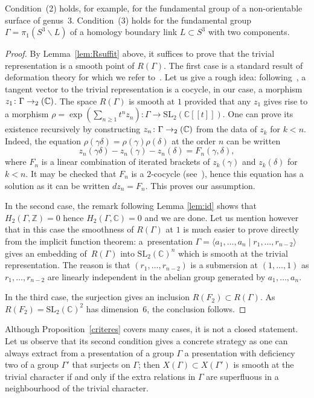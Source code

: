 \documentclass[JEP,XML,SOM,Unicode,NoEqCountersInSection]{cedram}
\newcommand{\lbr}{[\![}
\newcommand{\rbr}{]\!]}
\newcommand{\NoChangel}[1]{%
\expandafter\let\csname old\string#1\endcsname=#1
\let#1=\relax
\newcommand{#1}{\mathcode`l="716C\csname old\string#1\endcsname\mathcode`l="7160 }%
}
\theoremstyle{definition}
\newcommand{\ZZ}{\mathbb{Z}}
\newcommand{\CC}{\mathbb{C}}
\newcommand{\SL}{\mathrm{SL}}
\newcommand{\petitsl}{\mathrm{sl}}\NoChangel{\petitsl}
\begin{document}
Condition~(2) holds, for example, for the fundamental group of a
non-orientable surface of genus~3.
Condition~(3) holds for the fundamental group
$\Gamma=\pi_1(S^3\smallsetminus L)$ of a homology boundary link
$L\subset S^3$ with two components.

\begin{proof}
By Lemma~\ref{lem:Rsuffit} above, it suffices to prove that the trivial
representation is a smooth point of $R(\Gamma)$. The first case is a
standard result of deformation theory for which we refer
to~\cite{NijenhuisRichardson}. Let us give a rough idea:
following~\cite{Weil}, a tangent vector to the trivial representation is
a cocycle, in our case, a morphism $z_1\colon\Gamma\to \petitsl_2(\CC)$.
The space $R(\Gamma)$ is smooth at $1$ provided that any $z_1$ gives rise
to a morphism
$\rho=\exp(\sum_{n\geq 1} t^n z_n)\colon\Gamma\to \SL_2(\CC\lbr t\rbr)$.
One can prove its existence recursively by constructing
$z_n\colon\Gamma\to\petitsl_2(\CC)$ from the data of $z_k$ for $k<n$.
Indeed, the equation $\rho(\gamma\delta)=\rho(\gamma)\rho(\delta)$ at
the order $n$ can be written
\[ z_n(\gamma\delta)-z_n(\gamma)-z_n(\delta)=F_n(\gamma,\delta), \]
where $F_n$ is a linear combination of iterated brackets of $z_k(\gamma)$
and $z_k(\delta)$ for $k<n$. It may be checked that $F_n$ is a $2$-cocycle
(see~\cite{NijenhuisRichardson}), hence this equation has a solution as it
can be written $dz_n=F_n$. This proves our assumption.

In the second case, the remark following Lemma \ref{lem:id}
shows that $H_2(\Gamma,\ZZ)=0$ hence
$H_2(\Gamma,\CC)=0$ and we are done. Let us mention however that in this case
the smoothness of $R(\Gamma)$ at $1$ is much easier to prove directly from
the implicit function theorem: a~presentation
$\Gamma=\langle a_1,\ldots,a_n\mid r_1,\ldots,r_{n-2}\rangle$
gives an embedding of~$R(\Gamma)$ into $\SL_2(\CC)^n$ which
is smooth at the trivial representation. The reason is that
$(r_1,\ldots,r_{n-2})$ is a submersion at
$(1,\ldots,1)$ as $r_1,\ldots,r_{n-2}$ are linearly independent
in the abelian group generated by $a_1,\ldots,a_n$.

In the third case, the surjection gives an inclusion
$R(F_2)\subset R(\Gamma)$. As $R(F_2)=\SL_2(\CC)^2$ has dimension~6, the
conclusion follows.
\end{proof}

Although Proposition~\ref{criteres} covers many cases, it is not a closed
statement. Let us observe that its second condition gives a concrete
strategy as one can always extract from a presentation of a group $\Gamma$
a presentation with deficiency two of a group $\Gamma'$ that surjects on
$\Gamma$; then $X(\Gamma)\subset X(\Gamma')$ is smooth at the trivial
character if and only if the extra relations in $\Gamma$ are superfluous in
a neighbourhood of the trivial character.
\end{document}

